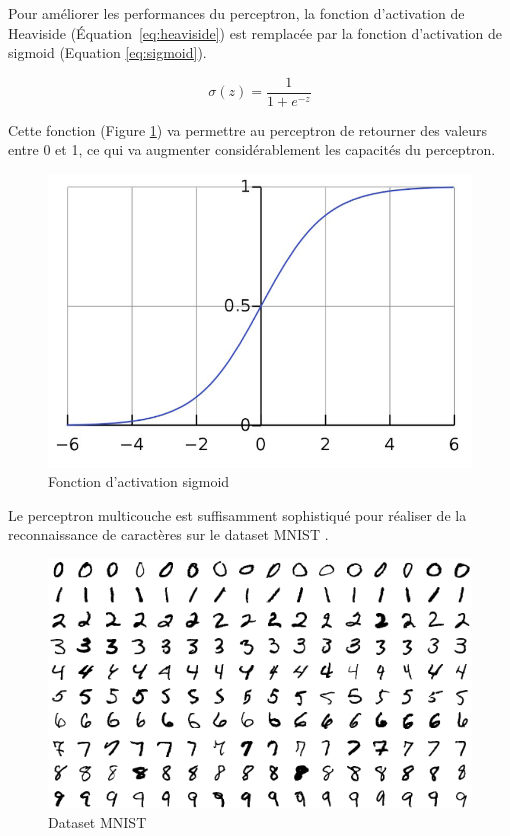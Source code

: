 Pour améliorer les performances du perceptron, la fonction d'activation de Heaviside (Équation~\ref{eq:heaviside}) est remplacée par la fonction d'activation de sigmoid (Equation \ref{eq:sigmoid}).

\begin{equation}
\sigma(z) = \frac{1}{1 + e^{-z}}
\label{eq:sigmoid}
\end{equation}

Cette fonction (Figure \ref{fig:A1_07_fonction_activation_sigmoid}) va permettre au perceptron de retourner des valeurs entre 0 et 1, ce qui va augmenter considérablement les capacités du perceptron.
\begin{figure}[H]
    \centering
    \includegraphics[width=0.75\linewidth]{03-tail//A1_fondamentaux_ML//A1_figures/A1_07_fonction_activation_sigmoid.png}
    \caption{Fonction d'activation sigmoid}
    \label{fig:A1_07_fonction_activation_sigmoid}
\end{figure}

Le perceptron multicouche est suffisamment sophistiqué pour réaliser de la reconnaissance de caractères sur le dataset MNIST \cite{lecun_gradient-based_1998}.

\begin{figure}[H]
    \centering
    \includegraphics[width=0.75\linewidth]{03-tail//A1_fondamentaux_ML//A1_figures/A1_08_dataset_mnist.png}
    \caption{Dataset MNIST \cite{lecun_gradient-based_1998}}
    \label{fig:A1_08_dataset_mnist}
\end{figure}

